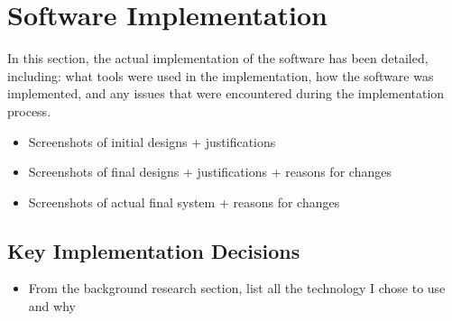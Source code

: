 \section{Software Implementation}
In this section, the actual implementation of the software has been detailed, including: what tools were used in the implementation, how the software was implemented, and any issues that were encountered during the implementation process.

{\color{red}
	\begin{itemize}
		\item Screenshots of initial designs + justifications
		\item Screenshots of final designs + justifications + reasons for changes
		\item Screenshots of actual final system + reasons for changes
	\end{itemize}
}

\subsection{Key Implementation Decisions}
\label{sec:kid}
{\color{red}
	\begin{itemize}
		\item From the background research section, list all the technology I chose to use and why
	\end{itemize}
}

